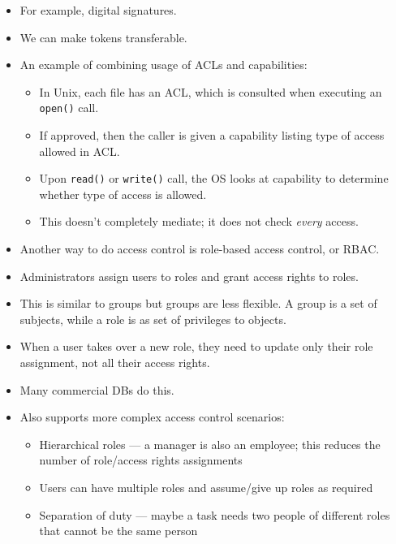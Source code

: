 \documentclass{article}
\begin{document}
\begin{itemize}
    \item For example, digital signatures.
    \item We can make tokens transferable.
    \item An example of combining usage of ACLs and capabilities:
        \begin{itemize}
            \item In Unix, each file has an ACL, which is consulted when executing an \lstinline{open()} call.
            \item If approved, then the caller is given a capability listing type of access allowed in ACL.
            \item Upon \lstinline{read()} or \lstinline{write()} call, the OS looks at capability to determine whether type of access is allowed.
            \item This doesn't completely mediate; it does not check \emph{every} access.
        \end{itemize}
    \item Another way to do access control is role-based access control, or RBAC.
    \item Administrators assign users to roles and grant access rights to roles.
    \item This is similar to groups but groups are less flexible.  A group is a set of subjects, while a role is as set of privileges to objects.
    \item When a user takes over a new role, they need to update only their role assignment, not all their access rights.
    \item Many commercial DBs do this.
    \item Also supports more complex access control scenarios:
        \begin{itemize}
            \item Hierarchical roles --- a manager is also an employee; this reduces the number of role/access rights assignments
            \item Users can have multiple roles and assume/give up roles as required
            \item Separation of duty --- maybe a task needs two people of different roles that cannot be the same person
        \end{itemize}
\end{itemize}
\end{document}

